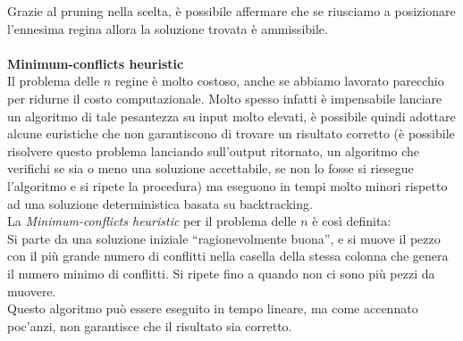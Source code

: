\documentclass[../cheatSheetAlgoritmi.tex]{subfiles}
\begin{document}
Grazie al pruning nella scelta, è possibile affermare che se riusciamo a posizionare l'ennesima regina allora la soluzione trovata è ammissibile. \\\\
\textbf{Minimum-conflicts heuristic} \\
Il problema delle $n$ regine è molto costoso, anche se abbiamo lavorato parecchio per ridurne il costo computazionale. Molto spesso infatti è impensabile lanciare un algoritmo di tale pesantezza su input molto elevati, è possibile quindi adottare alcune euristiche che non garantiscono di trovare un risultato corretto (è possibile risolvere questo problema lanciando sull'output ritornato, un algoritmo che verifichi se sia o meno una soluzione accettabile, se non lo fosse si riesegue l'algoritmo e si ripete la procedura) ma eseguono in tempi molto minori rispetto ad una soluzione deterministica basata su backtracking. \\
La \emph{Minimum-conflicts heuristic} per il problema delle $n$ è così definita: \\
Si parte da una soluzione iniziale “ragionevolmente buona”, e si muove il pezzo con il più grande numero di conflitti nella casella della stessa colonna che genera il numero minimo di conflitti. Si ripete fino a quando non ci sono più pezzi da muovere. \\
Questo algoritmo può essere eseguito in tempo lineare, ma come accennato poc'anzi, non garantisce che il risultato sia corretto.
\newpage
\end{document}
